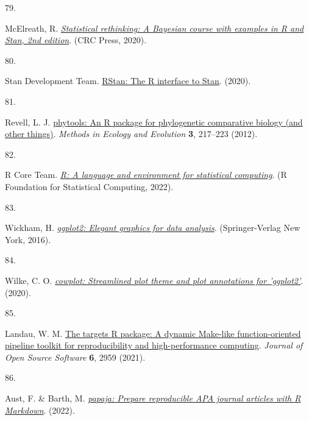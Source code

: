 \documentclass[
  man,floatsintext]{apa6}
\newlength{\cslhangindent}
\newlength{\csllabelwidth}
\newlength{\cslentryspacingunit} %
\newenvironment{CSLReferences}[2] %
 {%
  \setlength{\parindent}{0pt}
  \ifodd #1
  \let\oldpar\par
  \def\par{\hangindent=\cslhangindent\oldpar}
  \fi
  \setlength{\parskip}{#2\cslentryspacingunit}
 }%
 {}
\newcommand{\CSLLeftMargin}[1]{\parbox[t]{\csllabelwidth}{#1}}
\newcommand{\CSLRightInline}[1]{\parbox[t]{\linewidth - \csllabelwidth}{#1}\break}
\begin{document}
\begin{CSLReferences}{0}{0}
\leavevmode{}%
\CSLLeftMargin{79. }%
\CSLRightInline{McElreath, R. \emph{\href{http://xcelab.net/rm/statistical-rethinking/}{Statistical rethinking: A {Bayesian} course with examples in {R} and {Stan}, 2nd edition}}. (CRC Press, 2020).}

\leavevmode{}%
\CSLLeftMargin{80. }%
\CSLRightInline{Stan Development Team. \href{http://mc-stan.org/}{{RStan}: The {R} interface to {Stan}}. (2020).}

\leavevmode{}%
\CSLLeftMargin{81. }%
\CSLRightInline{Revell, L. J. \href{https://doi.org/10.1111/j.2041-210X.2011.00169.x}{{phytools}: An {R} package for phylogenetic comparative biology (and other things)}. \emph{Methods in Ecology and Evolution} \textbf{3}, 217--223 (2012).}

\leavevmode{}%
\CSLLeftMargin{82. }%
\CSLRightInline{R Core Team. \emph{\href{https://www.R-project.org/}{R: A language and environment for statistical computing}}. (R Foundation for Statistical Computing, 2022).}

\leavevmode{}%
\CSLLeftMargin{83. }%
\CSLRightInline{Wickham, H. \emph{\href{https://ggplot2.tidyverse.org}{{ggplot2}: Elegant graphics for data analysis}}. (Springer-Verlag New York, 2016).}

\leavevmode{}%
\CSLLeftMargin{84. }%
\CSLRightInline{Wilke, C. O. \emph{\href{https://CRAN.R-project.org/package=cowplot}{{cowplot}: Streamlined plot theme and plot annotations for 'ggplot2'}}. (2020).}

\leavevmode{}%
\CSLLeftMargin{85. }%
\CSLRightInline{Landau, W. M. \href{https://doi.org/10.21105/joss.02959}{The targets {R} package: A dynamic {M}ake-like function-oriented pipeline toolkit for reproducibility and high-performance computing}. \emph{Journal of Open Source Software} \textbf{6}, 2959 (2021).}

\leavevmode{}%
\CSLLeftMargin{86. }%
\CSLRightInline{Aust, F. \& Barth, M. \emph{\href{https://github.com/crsh/papaja}{{papaja}: {Prepare} reproducible {APA} journal articles with {R Markdown}}}. (2022).}

\end{CSLReferences}

\endgroup
\end{document}
